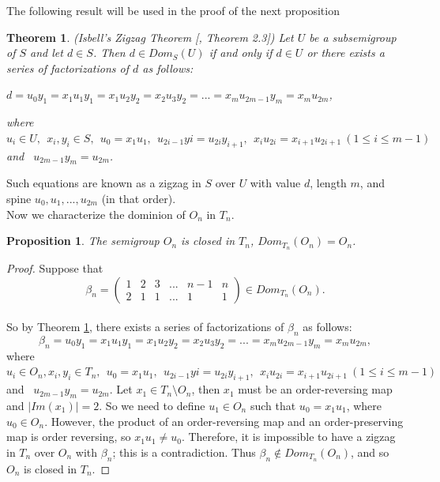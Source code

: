 \documentclass[10pt]{extarticle}
\numberwithin{equation}{section}
\numberwithin{bbb}{section}
\newtheorem{proposition}{Proposition}[section]
\newtheorem{theorem}{Theorem}[section]
\numberwithin{equation}{section}
\begin{document}
The following result will be used in the proof of the next proposition
\begin{theorem}(Isbell's Zigzag Theorem [\cite{RI}, Theorem 2.3]) \label{ZT}
    Let $U$ be a subsemigroup of $S$ and let $d \in S$. Then $d \in Dom_S(U)$ if and only if $d \in U$ or there exists a series of factorizations of $d$ as follows:
    \begin{center}
$d=u_0y_1=x_1u_1y_1=x_1u_2y_2=x_2u_3y_2=...=x_mu_{2m-1}y_m=x_mu_{2m}$,\\
    \end{center}
    where $u_i\in U, \ \ x_i,y_i\in S, \ \ u_0=x_1u_1, \ \ u_{2i-1}yi=u_{2i}y_{i+1}, \ \ x_iu_{2i}=x_{i+1}u_{2i+1} \ (1\leq i \leq m-1)$ and \ $u_{2m-1}y_m=u_{2m}$.
\end{theorem}
Such equations are known as a zigzag in $S$ over $U$ with value $d$, length $m$, and spine $u_0,u_1,...,
u_{2m}$ (in that order).\\

\vspace{0.5cm}
Now we characterize the dominion of $O_n$ in $T_n$.
\begin{proposition}
  The semigroup $O_n$ is closed in $T_n$, $Dom_{T_n}(O_n)=O_n$. 
\end{proposition}

\begin{proof}
 Suppose that 
 $$\beta_{n}=\begin{pmatrix}  1&2&3&...&n-1&n\\2&1&1&...&1&1
\end{pmatrix}\in Dom_{T_n}(O_n).$$\\[3pt]
So by Theorem \ref{ZT}, there exists a series of factorizations of $\beta_n$ as follows:
$$\beta_n=u_0y_1=x_1u_1y_1=x_1u_2y_2=x_2u_3y_2=...=x_mu_{2m-1}y_m=x_mu_{2m},$$
where $u_i\in O_n, x_i,y_i\in T_n, \ \ u_0=x_1u_1, \ \ u_{2i-1}yi=u_{2i}y_{i+1}, \ \ x_iu_{2i}=x_{i+1}u_{2i+1} \ (1\leq i \leq m-1)$ and \ $u_{2m-1}y_m=u_{2m}$.
Let $x_1 \in T_n  \setminus O_n$, then $x_1$ must be an order-reversing map and $|Im(x_1)|=2$. So we need to define $u_1 \in O_n$ such that $u_0=x_1u_1$, where $u_0 \in O_n$. However, the product of an order-reversing map and an order-preserving map is order reversing, so $x_1u_1 \neq u_0$. Therefore, it is impossible to have a zigzag in $T_n$ over $O_n$ with $\beta_n$; this is a contradiction. Thus $\beta_n \notin Dom_{T_n}(O_n)$, and so $O_n$ is closed in $T_n$. 
\end{proof}
\end{document}
